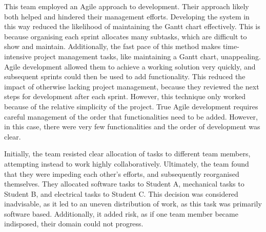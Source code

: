         This team employed an Agile approach to development.
        Their approach likely both helped and hindered their management efforts.
        Developing the system in this way reduced the likelihood of maintaining the Gantt chart effectively.
        This is because organising each sprint allocates many subtasks, which are difficult to show and maintain.
        Additionally, the fast pace of this method makes time-intensive project management tasks, like maintaining a Gantt chart, unappealing.
        Agile development allowed them to achieve a working solution very quickly, and subsequent sprints could then be used to add functionality.
        This reduced the impact of otherwise lacking project management, because they reviewed the next steps for development after each sprint.
        However, this technique only worked because of the relative simplicity of the project.
        True Agile development requires careful management of the order that functionalities need to be added.
        However, in this case, there were very few functionalities and the order of development was clear.

        Initially, the team resisted clear allocation of tasks to different team members, attempting instead to work highly collaboratively.
        Ultimately, the team found that they were impeding each other's efforts, and subsequently reorganised themselves.
        They allocated software tasks to Student A, mechanical tasks to Student B, and electrical tasks to Student C\@.
        This decision was considered inadvisable, as it led to an uneven distribution of work, as this task was primarily software based.
        Additionally, it added risk, as if one team member became indisposed, their domain could not progress.
